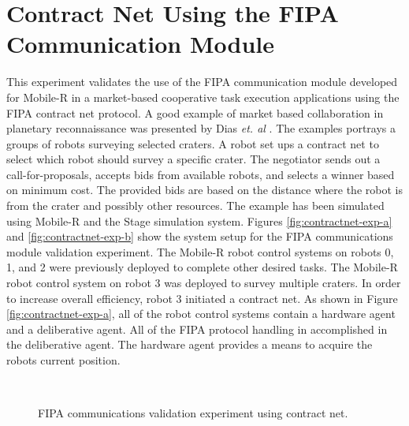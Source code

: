   \section{Contract Net Using the FIPA Communication Module} \label{sec:val_4}
    This experiment validates the use of the FIPA communication module 
      developed for Mobile-R in a market-based cooperative task execution 
      applications using the FIPA contract net protocol.
    A good example of market based collaboration in planetary reconnaissance 
       was presented by Dias \textit{et. al} \cite{Dias2006}.
    The examples portrays a groups of robots surveying selected craters.
    A robot set ups a contract net to select which robot should survey a
      specific crater.
    The negotiator sends out a call-for-proposals, accepts bids from available
      robots, and selects a winner based on minimum cost.
    The provided bids are based on the distance where the robot is from the 
      crater and possibly other resources.
    The example has been simulated using Mobile-R and the Stage simulation 
      system.
    Figures \ref{fig:contractnet-exp-a} and \ref{fig:contractnet-exp-b} show 
      the system setup for the FIPA communications module validation experiment.
    The Mobile-R robot control systems on robots 0, 1, and 2 were previously
      deployed to complete other desired tasks.
    The Mobile-R robot control system on robot 3 was deployed to survey 
      multiple craters.
    In order to increase overall efficiency, robot 3 initiated a contract net.
    As shown in Figure \ref{fig:contractnet-exp-a}, all of the robot control
      systems contain a hardware agent and a deliberative agent.
    All of the FIPA protocol handling in accomplished in the deliberative agent.
    The hardware agent provides a means to acquire the robots current position.
    \begin{figure}%
      \begin{center}
       \\
      \end{center}
      \caption{FIPA communications validation experiment using contract net.}
      \label{fig:contractnet-exp}
    \end{figure}
